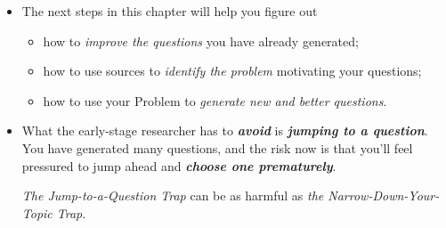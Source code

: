 \documentclass[11pt]{article}
\begin{document}
\begin{itemize}
\item The next steps in this chapter will help you figure out
\begin{itemize}
\item  how to \emph{improve the questions} you have already generated;
\item  how to use sources to \emph{identify the problem} motivating your questions;
\item  how to use your Problem to \emph{generate new and better questions}.
\end{itemize}

\item What the early-stage researcher has to \emph{\textbf{avoid}} is \emph{\textbf{jumping to a question}}. You have generated many questions, and the risk now is that you’ll feel pressured to jump ahead and \emph{\textbf{choose one prematurely}}.

\emph{The Jump-to-a-Question Trap} can be as harmful as \emph{the Narrow-Down-Your-Topic Trap}.
\end{itemize}
\end{document}
